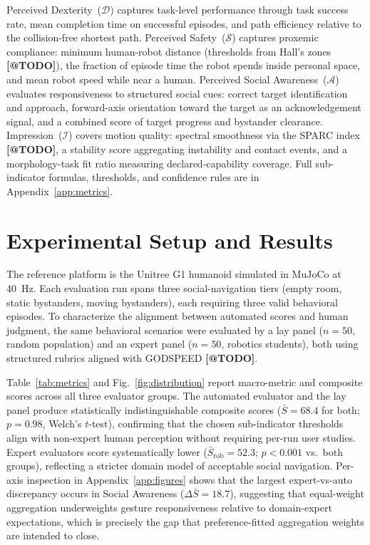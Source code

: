 \documentclass[conference]{IEEEtran}
\makeatletter
\newcommand{\tcite}{\textbf{[@TODO]}}
\makeatother
\begin{document}
Perceived Dexterity~($\mathcal{D}$) captures task-level performance through
task success rate, mean completion time on successful episodes, and path
efficiency relative to the collision-free shortest path.
Perceived Safety~($\mathcal{S}$) captures proxemic compliance: minimum
human-robot distance (thresholds from Hall's zones \tcite), the fraction of
episode time the robot spends inside personal space, and mean robot speed
while near a human.
Perceived Social Awareness~($\mathcal{A}$) evaluates responsiveness to
structured social cues: correct target identification and approach,
forward-axis orientation toward the target as an acknowledgement signal, and
a combined score of target progress and bystander clearance.
Impression~($\mathcal{I}$) covers motion quality: spectral smoothness via the
SPARC index \tcite, a stability score aggregating instability and contact events,
and a morphology-task fit ratio measuring declared-capability coverage.
Full sub-indicator formulas, thresholds, and confidence rules are in
Appendix~\ref{app:metrics}.

\section{Experimental Setup and Results}

The reference platform is the Unitree G1 humanoid simulated in MuJoCo at
\SI{40}{Hz}.
Each evaluation run spans three social-navigation tiers (empty room, static
bystanders, moving bystanders), each requiring three valid behavioral episodes.
To characterize the alignment between automated scores and human judgment, the
same behavioral scenarios were evaluated by a lay panel ($n{=}50$, random
population) and an expert panel ($n{=}50$, robotics students), both using
structured rubrics aligned with GODSPEED \tcite.

Table~\ref{tab:metrics} and Fig.~\ref{fig:distribution} report macro-metric
and composite scores across all three evaluator groups.
The automated evaluator and the lay panel produce statistically
indistinguishable composite scores ($\bar{S} = 68.4$ for both;
$p = 0.98$, Welch's $t$-test), confirming that the chosen sub-indicator
thresholds align with non-expert human perception without requiring per-run
user studies.
Expert evaluators score systematically lower
($\bar{S}_\text{rob} = 52.3$; $p < 0.001$ vs.\ both groups), reflecting a
stricter domain model of acceptable social navigation.
Per-axis inspection in Appendix~\ref{app:figures} shows that the largest
expert-vs-auto discrepancy occurs in Social Awareness ($\Delta\bar{S} = 18.7$),
suggesting that equal-weight aggregation underweights gesture responsiveness
relative to domain-expert expectations, which is precisely the gap that
preference-fitted aggregation weights are intended to close.
\end{document}
